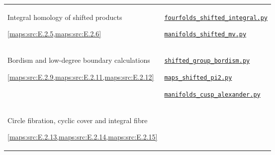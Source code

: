 \begin{longtable}{@{}p{}p{}@{}}
\hypertarget{prog:V:shifted-homology}{}Integral homology of shifted products\par \cref{maps:src:E.2.5,maps:src:E.2.6} &
\href{https://github.com/KokunoYumeto/s6-complex-structure-workbench/blob/\SsixRepositoryCommit/pro_returns/S6_10_PAPERS_checkpoint_15_20261119T1045Z/S6_10_PAPERS/code/V/replay_chains/code/fourfolds_shifted_integral.py}{\nolinkurl{fourfolds_shifted_integral.py}}\par \href{https://github.com/KokunoYumeto/s6-complex-structure-workbench/blob/\SsixRepositoryCommit/pro_returns/S6_10_PAPERS_checkpoint_15_20261119T1045Z/S6_10_PAPERS/code/V/replay_chains/code/manifolds_shifted_mv.py}{\nolinkurl{manifolds_shifted_mv.py}} \\[3pt]
\hypertarget{prog:V:equivariant}{}Bordism and low-degree boundary calculations\par \cref{maps:src:E.2.9,maps:src:E.2.11,maps:src:E.2.12} &
\href{https://github.com/KokunoYumeto/s6-complex-structure-workbench/blob/\SsixRepositoryCommit/pro_returns/S6_10_PAPERS_checkpoint_15_20261119T1045Z/S6_10_PAPERS/code/V/replay_chains/code/shifted_group_bordism.py}{\nolinkurl{shifted_group_bordism.py}}\par \href{https://github.com/KokunoYumeto/s6-complex-structure-workbench/blob/\SsixRepositoryCommit/pro_returns/S6_10_PAPERS_checkpoint_15_20261119T1045Z/S6_10_PAPERS/code/V/replay_chains/code/maps_shifted_pi2.py}{\nolinkurl{maps_shifted_pi2.py}}\par \href{https://github.com/KokunoYumeto/s6-complex-structure-workbench/blob/\SsixRepositoryCommit/pro_returns/S6_10_PAPERS_checkpoint_15_20261119T1045Z/S6_10_PAPERS/code/V/replay_chains/code/manifolds_cusp_alexander.py}{\nolinkurl{manifolds_cusp_alexander.py}} \\[3pt]
\hypertarget{prog:V:cyclic-cover}{}Circle fibration, cyclic cover and integral fibre\par \cref{maps:src:E.2.13,maps:src:E.2.14,maps:src:E.2.15} &

\end{longtable}
